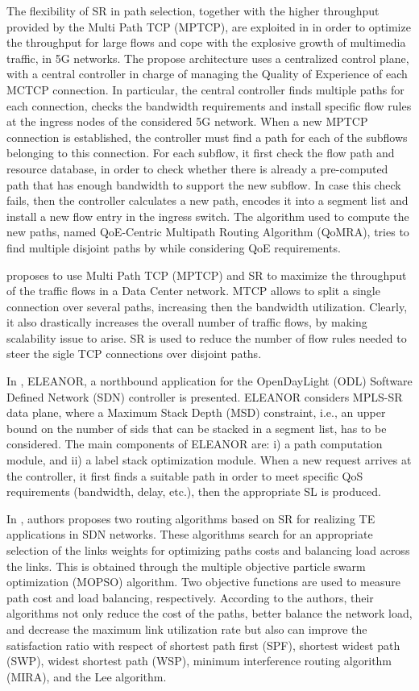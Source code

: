 The flexibility of SR in path selection, together with the higher throughput provided by the Multi Path TCP (MPTCP), are exploited in \cite{barakabitze2018novel} in order to optimize the throughput for large flows and cope with the explosive growth of multimedia traffic, in 5G networks.
The propose architecture uses a centralized control plane, with a central controller in charge of managing the Quality of Experience of each MCTCP connection.
In particular, the central controller finds multiple paths for each connection, checks the bandwidth requirements and install specific flow rules at the ingress nodes of the considered 5G network.
When a new MPTCP connection is established, the controller must find a path for each of the subflows belonging to this connection.
For each subflow, it first check the flow path and resource database, in order to check whether there is already a pre-computed path that has enough bandwidth to support the new subflow.
In case this check fails, then the controller calculates a new path, encodes it into a segment list and install a new flow entry in the ingress switch.
The algorithm used to compute the new paths, named QoE-Centric Multipath Routing Algorithm (QoMRA), tries to find multiple disjoint paths by while considering QoE requirements.

\cite{pang2017sdn} proposes to use Multi Path TCP (MPTCP) and SR to maximize the throughput of the traffic flows in a Data Center network. 
MTCP allows to split a single connection over several paths, increasing then the bandwidth utilization.
Clearly, it also drastically increases the overall number of traffic flows, by making scalability issue to arise.
SR is used to reduce the number of flow rules needed to steer the sigle TCP connections over disjoint paths.

In \cite{dugeon2017demonstration}, ELEANOR, a northbound application for the OpenDayLight (ODL) Software Defined Network (SDN) controller is presented.
ELEANOR considers MPLS-SR data plane, where a Maximum Stack Depth (MSD) constraint, i.e., an upper bound on the number of sids that can be stacked in a segment list, has to be considered.
The main components of ELEANOR are: i) a path computation module, and ii) a label stack optimization module.
When a new request arrives at the controller, it first finds a suitable path in order to meet specific QoS requirements (bandwidth, delay, etc.), then the appropriate SL is produced.

In \cite{hou2019optimization}, authors proposes two routing algorithms based on SR for realizing TE applications in SDN networks. These algorithms  search for an appropriate selection of the links weights for optimizing paths costs and balancing load across the links. This is obtained through the multiple objective particle swarm optimization (MOPSO) algorithm. Two objective functions are used to measure path cost and load balancing, respectively.
According to the authors, their algorithms not only reduce the cost of the paths, better balance the network load, and decrease the maximum link utilization rate but also can improve the satisfaction ratio with respect of shortest path first (SPF), shortest widest path (SWP), widest shortest path (WSP), minimum interference routing algorithm (MIRA), and the Lee algorithm.

